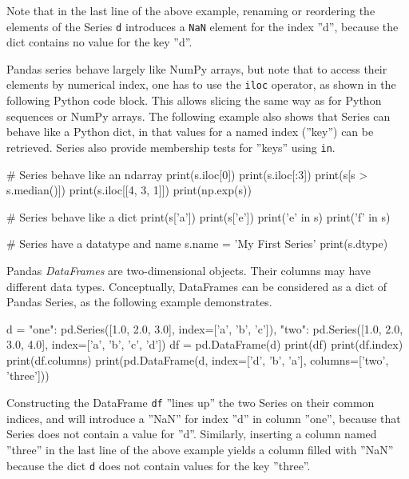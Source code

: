 Note that in the last line of the above example, renaming or reordering the elements of the Series \texttt{d} introduces a \texttt{NaN} element for the index ''d'', because the dict contains no value for the key ''d''.

Pandas series behave largely like NumPy arrays, but note that to access their elements by numerical index, one has to use the \texttt{iloc} operator, as shown in the following Python code block. This allows slicing the same way as for Python sequences or NumPy arrays. The following example also shows that Series can behave like a Python dict, in that values for a named index (''key'') can be retrieved. Series also provide membership tests for ''keys'' using \texttt{in}. 

\begin{samepage}
\begin{pythoncode}
# Series behave like an ndarray
print(s.iloc[0])
print(s.iloc[:3])
print(s[s > s.median()])
print(s.iloc[[4, 3, 1]])
print(np.exp(s))

# Series behave like a dict
print(s['a'])
print(s['e'])
print('e' in s)
print('f' in s)

# Series have a datatype and name
s.name = 'My First Series'
print(s.dtype)
\end{pythoncode}
\end{samepage}

Pandas \emph{DataFrames} are two-dimensional objects. Their columns may have different data types. Conceptually, DataFrames can be considered as a dict of Pandas Series, as the following example demonstrates. 

\begin{samepage}
\begin{pythoncode}
d = {
    "one": pd.Series([1.0, 2.0, 3.0], 
                index=['a', 'b', 'c']),
    "two": pd.Series([1.0, 2.0, 3.0, 4.0], 
                index=['a', 'b', 'c', 'd'])
}
df = pd.DataFrame(d)
print(df)
print(df.index)
print(df.columns)
print(pd.DataFrame(d, index=['d', 'b', 'a'], 
                      columns=['two', 'three']))
\end{pythoncode}
\end{samepage}

Constructing the DataFrame \texttt{df} ''lines up'' the two Series on their common indices, and will introduce a ''NaN'' for index ''d'' in column ''one'', because that Series does not contain a value for ''d''. Similarly, inserting a column named ''three'' in the last line of the above example yields a column filled with ''NaN'' because the dict \texttt{d} does not contain values for the key ''three''.

